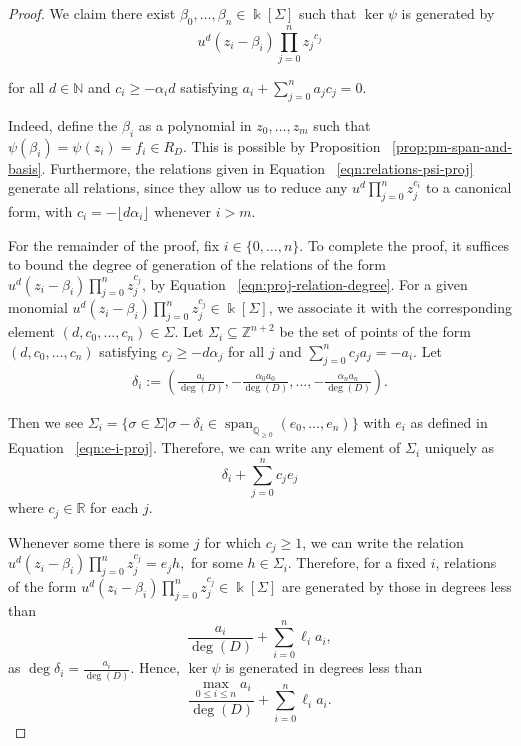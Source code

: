 \documentclass{amsart}
\theoremstyle{plain}
\theoremstyle{definition}
\theoremstyle{remark}
\numberwithin{equation}{subsection}
\newcommand\bq{{\mathbb Q}}
\newcommand\bz{{\mathbb Z}}
\newcommand\bk{{\Bbbk}}
\newcommand\bida{a}
\DeclareMathOperator{\newspan}{span}
\begin{document}
\begin{proof}
We claim there exist $\beta_0, \ldots, \beta_n \in \bk[\Sigma]$
such that $\ker \psi$ is generated by
\begin{equation}
\label{eqn:relations-psi-proj}
	u^d(z_i - \beta_i)\prod_{j=0}^n {z_j}^{c_{j}}
\end{equation}

\noindent
for all $d \in \mathbb{N}$ and $c_i \ge -\alpha_i d$ satisfying
$\bida_i + \sum_{j = 0}^n \bida_j c_j = 0$.

Indeed, define the $\beta_i$ as a polynomial in $z_0, \ldots, z_m$ such that $\psi(\beta_i) = \psi(z_i) = f_i \in R_D.$ This is possible by Proposition ~\ref{prop:pm-span-and-basis}.
Furthermore, the relations given in Equation
~\eqref{eqn:relations-psi-proj} generate all relations, since they
allow us to reduce any $u^d \prod_{j = 0}^n z_j^{c_i}$ to a canonical
form, with $c_i = -\lfloor  d \alpha_i\rfloor$ whenever $i  > m$.

For the remainder of the proof, fix $i \in \{0,\ldots, n\}$. To
complete the proof, it suffices to bound the degree of generation
of the relations of the form $u^d(z_i - \beta_i) \prod_{j = 0}^n
z_j^{c_j}$, by Equation ~\eqref{eqn:proj-relation-degree}. For
a given monomial
$u^d(z_i - \beta_i)\prod_{j=0}^n z_j^{c_j} \in \bk[\Sigma]$, we associate it with the corresponding element $(d, c_0,\ldots, c_n) \in\Sigma$. Let $\Sigma_i \subseteq \bz^{n + 2}$
be the set of points of the form $(d, c_0, \ldots, c_n)$ satisfying
$c_j \ge -d \alpha_j$ for all $j$ and $\sum_{j=0}^n c_j a_j = -a_i$.
Let
\begin{align*}
	\delta_i := \left(\frac{a_i}{\deg(D)}, -\frac{\alpha_0 a_0}{\deg(D)},
	\ldots, - \frac{\alpha_n a_n}{\deg(D)} \right).
\end{align*}

\noindent
Then we see $\Sigma_i = \{\sigma \in \Sigma | \sigma - \delta_i \in \newspan_{\bq_{\geq 0}}
(e_0, \ldots, e_n)\}$ with $e_i$ as defined in Equation
~\ref{eqn:e-i-proj}. Therefore, we can write any element of
$\Sigma_i$ uniquely as
\[
	\delta_i + \sum_{j=0}^n c_j e_j
\]
where $c_j \in \mathbb{R}$ for each $j$.

Whenever some there is some $j$ for which $c_j \ge 1$, we can write the relation $u^d(z_i -
\beta_i)\prod_{j=0}^n z_j^{c_j} = e_j h,$ for some
$h \in \Sigma_i$. Therefore, for a fixed $i$, relations of the form
$u^d(z_i - \beta_i)\prod_{j=0}^n z_j^{c_j} \in \bk[\Sigma]$ are
generated by those in degrees less than
\[
	\frac{\bida_i}{\deg(D)} + \sum_{i=0}^n \ell_i a_i,
\]
as $\deg \delta_i = \frac{a_i}{\deg(D)}$. Hence,
$\ker \psi$ is generated in degrees less than
\[
	\frac{\max_{0 \leq i \leq n} \bida_i}{\deg(D)} + \sum_{i=0}^n \ell_i a_i.
\]
\end{proof}
\end{document}

